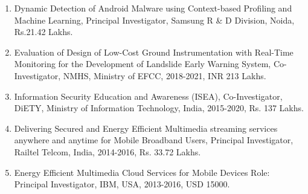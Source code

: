 \begin{enumerate}

\item Dynamic Detection of Android Malware using Context-based Profiling and Machine Learning, Principal Investigator, Samsung R \& D Division, Noida, Rs.21.42 Lakhs. 

\item Evaluation of Design of Low-Cost Ground Instrumentation with Real-Time Monitoring for the Development of Landslide Early Warning System, Co-Investigator, NMHS, Ministry of EFCC, 2018-2021, INR 213 Lakhs.

\item Information Security Education and Awareness (ISEA), Co-Investigator, DiETY, Ministry of Information Technology, India, 2015-2020, Rs. 137 Lakhs. 

\item Delivering Secured and Energy Efficient Multimedia streaming services anywhere and anytime for Mobile Broadband Users, Principal Investigator, Railtel Telcom, India, 2014-2016, Rs. 33.72 Lakhs. 

\item Energy Efficient Multimedia Cloud Services for Mobile Devices 
Role: Principal Investigator, IBM, USA, 2013-2016, USD 15000.

\end{enumerate}